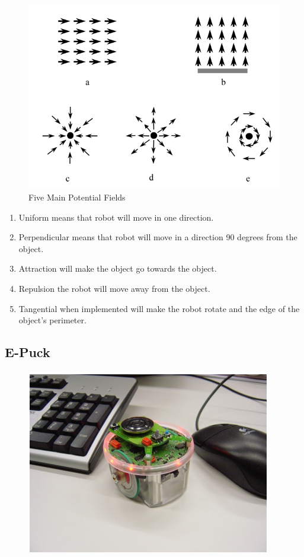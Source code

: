 \begin{figure}
\centering
\includegraphics[width=0.7\linewidth]{figures/Potential_fields}
\caption{Five Main Potential Fields}
\label{fig:Potential_fields}
\end{figure}

\begin{enumerate}
	\item Uniform means that robot will move in one direction.
	\item Perpendicular means that robot will move in a direction 90 degrees from the object.
	\item Attraction will make the object go towards the object.
	\item Repulsion the robot will move away from the object. \item Tangential when implemented will make the robot rotate and the edge of the object's perimeter. 
\end{enumerate}

\subsection{E-Puck}

\begin{figure}
\centering
\includegraphics[width=0.7\linewidth]{figures/epcuk}
\caption{}
\label{fig:epcuk}
\end{figure}


